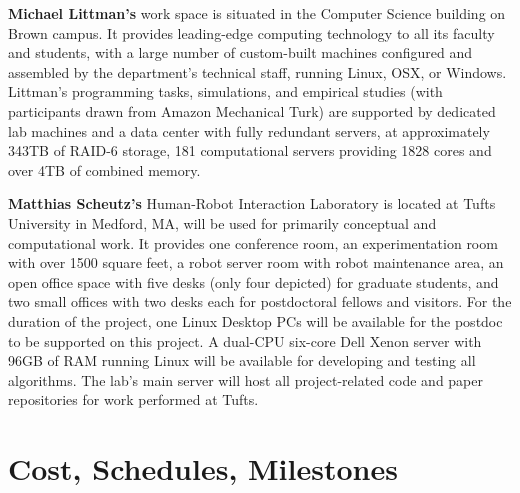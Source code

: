 \documentclass[12pt]{article}
\begin{document}
\vspace{1 mm} 
\noindent \textbf{Michael Littman's} work space is situated in the Computer Science building on Brown campus. It provides leading-edge computing technology to all its faculty and students, with a large number of custom-built machines configured and assembled by the department's
technical staff, running Linux, OSX, or Windows.  Littman's programming tasks, simulations, and empirical studies (with participants drawn from Amazon Mechanical Turk) are supported by dedicated lab machines and a data center with fully redundant servers, at  approximately 343TB of RAID-6 storage, 181 computational servers providing 1828 cores and over 4TB of combined memory. 

\vspace{1 mm} 
\noindent \textbf{Matthias Scheutz's} Human-Robot Interaction Laboratory
is located at Tufts
University in Medford, MA, will be used for primarily conceptual and
computational work.  It provides one conference room, an
experimentation room with over 1500 square feet, a robot server room
with robot maintenance area, an open office space with five desks
(only four depicted) for graduate students, and two small offices with
two desks each for postdoctoral fellows and visitors.  For the
duration of the project, one Linux Desktop PCs will be available for
the postdoc to be supported on this project.  A dual-CPU six-core Dell
Xenon server with 96GB of RAM running Linux will be available for
developing and testing all algorithms. The lab's main server will host
all project-related code and paper repositories for work performed at
Tufts.


\section*{Cost, Schedules, Milestones}
 
\end{document}
